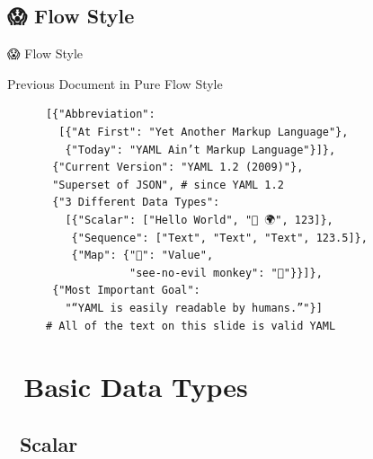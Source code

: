 \documentclass{beamer}
\begin{document}
\subsection{😱 Flow Style}

\begin{frame}[fragile]{😱 Flow Style}
  \begin{block}{Previous Document in Pure Flow Style}~\\
    \begin{verbatim}
      [{"Abbreviation":
        [{"At First": "Yet Another Markup Language"},
         {"Today": "YAML Ain’t Markup Language"}]},
       {"Current Version": "YAML 1.2 (2009)"},
       "Superset of JSON", # since YAML 1.2
       {"3 Different Data Types":
         [{"Scalar": ["Hello World", "👋 🌍", 123]},
          {"Sequence": ["Text", "Text", "Text", 123.5]},
          {"Map": {"🔑": "Value",
                   "see-no-evil monkey": "🙈"}}]},
       {"Most Important Goal":
         "“YAML is easily readable by humans.”"}]
      # All of the text on this slide is valid YAML
    \end{verbatim}
  \end{block}
\end{frame}

\section{🐣 Basic Data Types}

\subsection{📏  Scalar}
\end{document}
